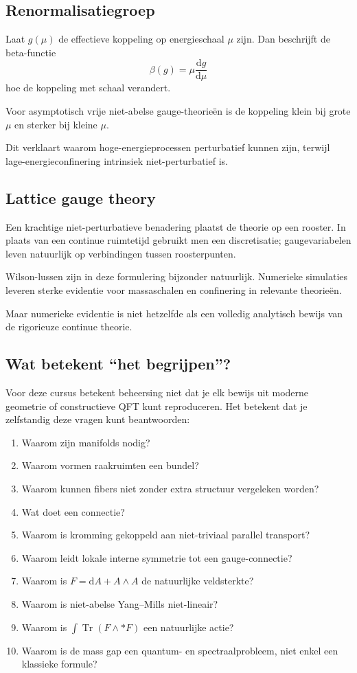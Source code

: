 \documentclass[11pt,a4paper]{article}
\newcommand{\dd}{\mathrm{d}}
\newcommand{\Tr}{\operatorname{Tr}}
\begin{document}
\subsection{Renormalisatiegroep}

Laat $g(\mu)$ de effectieve koppeling op energieschaal $\mu$ zijn. Dan beschrijft de beta-functie
\[
\beta(g)=\mu\frac{\dd g}{\dd\mu}
\]
hoe de koppeling met schaal verandert.

Voor asymptotisch vrije niet-abelse gauge-theorieën is de koppeling klein bij grote $\mu$ en sterker bij kleine $\mu$.

Dit verklaart waarom hoge-energieprocessen perturbatief kunnen zijn, terwijl lage-energieconfinering intrinsiek niet-perturbatief is.

\subsection{Lattice gauge theory}

Een krachtige niet-perturbatieve benadering plaatst de theorie op een rooster. In plaats van een continue ruimtetijd gebruikt men een discretisatie; gaugevariabelen leven natuurlijk op verbindingen tussen roosterpunten.

Wilson-lussen zijn in deze formulering bijzonder natuurlijk. Numerieke simulaties leveren sterke evidentie voor massaschalen en confinering in relevante theorieën.

Maar numerieke evidentie is niet hetzelfde als een volledig analytisch bewijs van de rigorieuze continue theorie.

\subsection{Wat betekent ``het begrijpen''?}

Voor deze cursus betekent beheersing niet dat je elk bewijs uit moderne geometrie of constructieve QFT kunt reproduceren. Het betekent dat je zelfstandig deze vragen kunt beantwoorden:
\begin{enumerate}
    \item Waarom zijn manifolds nodig?
    \item Waarom vormen raakruimten een bundel?
    \item Waarom kunnen fibers niet zonder extra structuur vergeleken worden?
    \item Wat doet een connectie?
    \item Waarom is kromming gekoppeld aan niet-triviaal parallel transport?
    \item Waarom leidt lokale interne symmetrie tot een gauge-connectie?
    \item Waarom is $F=\dd A+A\wedge A$ de natuurlijke veldsterkte?
    \item Waarom is niet-abelse Yang--Mills niet-lineair?
    \item Waarom is $\int\Tr(F\wedge *F)$ een natuurlijke actie?
    \item Waarom is de mass gap een quantum- en spectraalprobleem, niet enkel een klassieke formule?
\end{enumerate}
\end{document}
